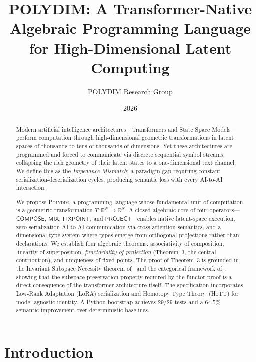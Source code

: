 \documentclass[10pt,twocolumn]{article}
\title{\textbf{POLYDIM: A Transformer-Native Algebraic Programming Language\\
for High-Dimensional Latent Computing}}
\author[1]{POLYDIM Research Group}
\affil[1]{\texttt{ai.mpat.agt@gmail.com}}
\date{2026}
\theoremstyle{plain}
\theoremstyle{definition}
\theoremstyle{remark}
\newcommand{\RR}{\mathbb{R}}
\newcommand{\Compose}{\mathsf{COMPOSE}}
\newcommand{\Mix}{\mathsf{MIX}}
\newcommand{\Fixpoint}{\mathsf{FIXPOINT}}
\newcommand{\Project}{\mathsf{PROJECT}}
\begin{document}

\maketitle

\begin{abstract}
Modern artificial intelligence architectures---Transformers and State Space
Models---perform computation through high-dimensional geometric transformations
in latent spaces of thousands to tens of thousands of dimensions. Yet these
architectures are programmed and forced to communicate via discrete sequential
symbol streams, collapsing the rich geometry of their latent states to a
one-dimensional text channel. We define this as the \emph{Impedance Mismatch}:
a paradigm gap requiring constant serialization-deserialization cycles,
producing semantic loss with every AI-to-AI interaction.

We propose \textsc{Polydim}, a programming language whose fundamental unit of
computation is a geometric transformation $T\colon \RR^N \to \RR^N$. A closed
algebraic core of four operators---$\Compose$, $\Mix$, $\Fixpoint$, and
$\Project$---enables native latent-space execution, zero-serialization AI-to-AI
communication via cross-attention semantics, and a dimensional type system where
types emerge from orthogonal projections rather than declarations. We establish
four algebraic theorems: associativity of composition, linearity of
superposition, \emph{functoriality of projection} (Theorem~3, the central
contribution), and uniqueness of fixed points. The proof of Theorem~3 is
grounded in the Invariant Subspace Necessity theorem of~\citet{suarez2026invariant}
and the categorical framework of~\citet{oneill2025endofunctor}, showing that
the subspace-preservation property required by the functor proof is a direct
consequence of the transformer architecture itself. The specification
incorporates Low-Rank Adaptation (LoRA) serialization and Homotopy Type
Theory~(HoTT) for model-agnostic identity. A Python bootstrap achieves $29/29$
tests and a $64.5\%$ semantic improvement over deterministic baselines.
\end{abstract}

\section{Introduction}
\end{document}
